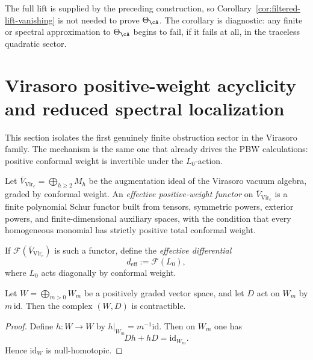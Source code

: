 \begin{remark}
\label{rem:filtered-lift-use-after-mc2}
The full lift is supplied by the preceding construction, so
Corollary~\ref{cor:filtered-lift-vanishing} is not needed to prove
\(\Theta_{\cA}\). The corollary is diagnostic: any finite or spectral
approximation to \(\Theta_{\cA}\) begins to fail, if it fails at all,
in the traceless quadratic sector.
\end{remark}

\section{Virasoro positive-weight acyclicity and reduced spectral localization}
\label{sec:blr-vir-positive-weight}

This section isolates the first genuinely finite obstruction sector in
the Virasoro family. The mechanism is the same one that already drives
the PBW calculations: positive conformal weight is invertible under the
\(L_0\)-action.

\begin{definition}
\label{def:effective-positive-weight-functor}
Let \(\bar V_{\mathrm{Vir}_c}=\bigoplus_{h\geq 2} M_h\) be the
augmentation ideal of the Virasoro vacuum algebra, graded by conformal
weight. An \emph{effective positive-weight functor} on
\(\bar V_{\mathrm{Vir}_c}\) is a finite polynomial Schur functor built
from tensors, symmetric powers, exterior powers, and finite-dimensional
auxiliary spaces, with the condition that every homogeneous monomial has
strictly positive total conformal weight.

If \(\mathcal F(\bar V_{\mathrm{Vir}_c})\) is such a functor, define the
\emph{effective differential}
\begin{equation}
\label{eq:effective-L0-differential}
 d_{\mathrm{eff}}:=\mathcal F(L_0),
\end{equation}
where \(L_0\) acts diagonally by conformal weight.
\end{definition}

\begin{lemma}
\label{lem:positive-weight-contraction}
Let \(W=\bigoplus_{m>0}W_m\) be a positively graded vector space, and let
\(D\) act on \(W_m\) by \(m\,\mathrm{id}\). Then the complex
\((W,D)\) is contractible.
\end{lemma}

\begin{proof}
Define \(h\colon W\to W\) by
\(h|_{W_m}=m^{-1}\mathrm{id}\).
Then on \(W_m\) one has
\[
Dh+hD=\mathrm{id}_{W_m}.
\]
Hence \(\mathrm{id}_W\) is null-homotopic.
\end{proof}

